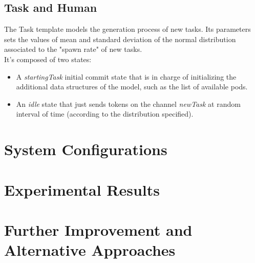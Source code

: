\documentclass[10pt,a4paper]{article}
\begin{document}
		\subsection{Task and Human}
			The Task template models the generation process of new tasks. Its parameters sets the values of mean and standard deviation of the normal distribution associated to the "spawn rate" of new tasks.\\
			It's composed of two states:
			\begin{itemize}
				\item A \emph{startingTask} initial commit state that is in charge of initializing the additional data structures of the model, such as the list of available pods.
				\item An \emph{idle} state that just sends tokens on the channel \emph{newTask} at random interval of time (according to the distribution specified).
			\end{itemize}
			
	
	\section{System Configurations}
	
	\section{Experimental Results}
	
	\section{Further Improvement and Alternative Approaches}
	
	
\end{document}
